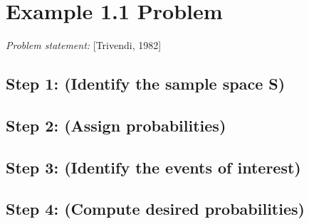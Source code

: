 \documentclass[a4paper,10pt]{article}
\title{}
\author{Mark Johnson \\
Loyola University Chicago}
\date {mjohnson4@luc.edu}
\begin{document}
\maketitle
\section{Example 1.1 Problem}
\emph{Problem statement:} [Trivendi, 1982]
\subsection{Step 1: (Identify the sample space S)}

\subsection{Step 2: (Assign probabilities)}

\subsection{Step 3: (Identify the events of interest)}

\subsection{Step 4: (Compute desired probabilities)}
\end{document}
